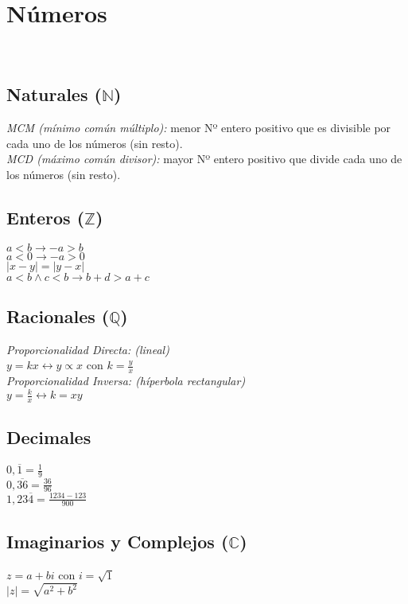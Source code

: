 \section{Números}
\def\svgwidth{\columnwidth}
\\
\subsection*{Naturales ($\mathbb{N}$)}
\textit{MCM (mínimo común múltiplo):}
menor Nº  entero positivo que es divisible por cada uno de los números (sin resto).\\
\textit{MCD (máximo común divisor):}
mayor Nº entero positivo que divide cada uno de los números (sin resto).\\

\subsection*{Enteros ($\mathbb{Z}$)}
$a < b \rightarrow -a > b$\\
$a < 0 \rightarrow -a > 0$\\
$|x - y| = |y - x|$\\
$ a < b \land c < b \rightarrow b + d > a + c $\\

\subsection*{Racionales ($\mathbb{Q}$)}
\textit{Proporcionalidad Directa: (lineal)}\\
$ y = kx \leftrightarrow y \propto x $ con $k = \frac{y}{x}$\\
\textit{Proporcionalidad Inversa: (híperbola rectangular)}\\
$ y = \frac{k}{x} \leftrightarrow k = xy$\\

\subsection*{Decimales}
$ 0,\overline{1} = \frac{1}{9} $\\
$ 0,\overline{36} = \frac{36}{96} $\\
$ 1,23\overline{4} = \frac{1234 -123}{900} $\\

\subsection*{Imaginarios y Complejos ($\mathbb{C}$)}
$ z = a + bi $ con $ i = \sqrt{1} $\\
$\mid z \mid = \sqrt{a^2 + b^2}$\\

